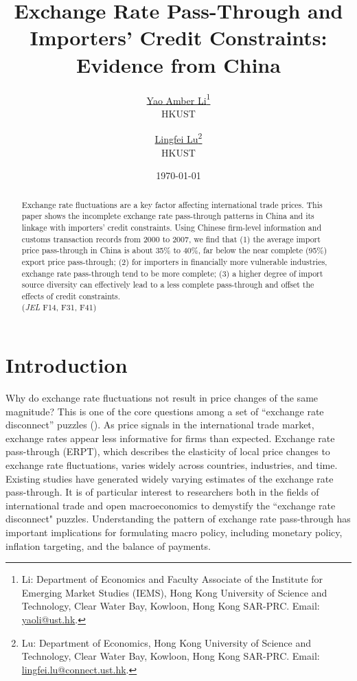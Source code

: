 \documentclass[12pt]{article}
\begin{document}
\title{  \Large \textbf{Exchange Rate Pass-Through and Importers' Credit Constraints: Evidence from China}}

\author{\large \href{http://yaoli.people.ust.hk/}{Yao Amber Li}\thanks{Li: Department of Economics and Faculty Associate of the Institute for Emerging Market Studies (IEMS), Hong Kong University of Science and Technology, Clear Water Bay, Kowloon, Hong Kong SAR-PRC. Email: \href{mailto:yaoli@ust.hk}{yaoli@ust.hk}.}\\ \large{HKUST}
\and \large \href{}{Lingfei Lu}\thanks{Lu: Department of Economics, Hong Kong University of Science and Technology, Clear Water Bay, Kowloon, Hong Kong SAR-PRC. Email: \href{mailto:}{lingfei.lu@connect.ust.hk}.} \\ \large{HKUST}
 }

\date{\today }

\maketitle

\begin{abstract}
Exchange rate fluctuations are a key factor affecting international trade prices. This paper shows the incomplete exchange rate pass-through patterns in China and its linkage with importers' credit constraints. Using Chinese firm-level information and customs transaction records from 2000 to 2007, we find that (1) the average import price pass-through in China is about 35\% to 40\%, far below the near complete (95\%) export price pass-through; (2) for importers in financially more vulnerable industries, exchange rate pass-through tend to be more complete; (3) a higher degree of import source diversity can effectively lead to a less complete  pass-through and offset the effects of credit constraints.\\
(\textit{JEL} F14, F31, F41)

\end{abstract}

\section{Introduction} \label{Introduction}

Why do exchange rate fluctuations not result in price changes of the same magnitude? This is one of the core questions among a set of ``exchange rate disconnect'' puzzles (\cite{obstfeld2000}). As price signals in the international trade market, exchange rates appear less informative for firms than expected. Exchange rate pass-through (ERPT), which describes the elasticity of local price changes to exchange rate fluctuations, varies widely across countries, industries, and time. Existing studies have generated widely varying estimates of the exchange rate pass-through. It is of particular interest to researchers both in the fields of international trade and open macroeconomics to demystify the ``exchange rate disconnect" puzzles. Understanding the pattern of exchange rate pass-through has important implications for formulating macro policy, including monetary policy, inflation targeting, and the balance of payments.
\end{document}
